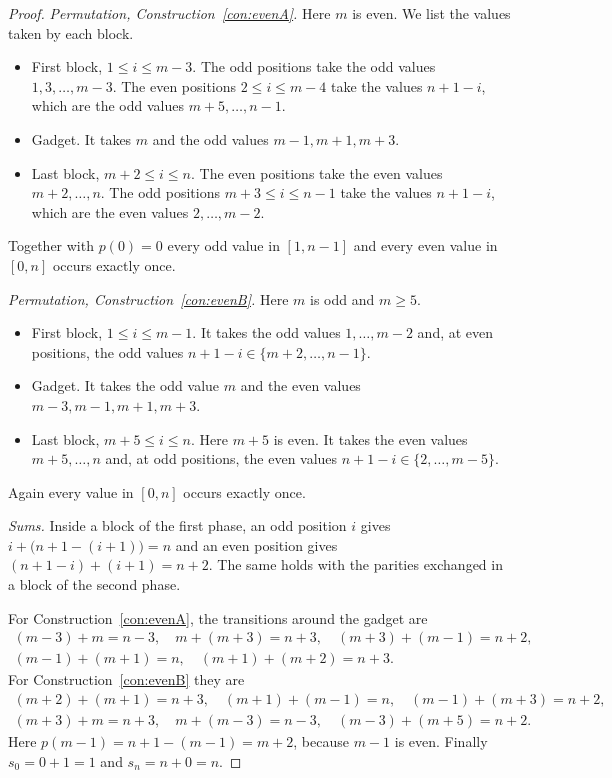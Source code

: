 \documentclass[11pt]{article}
\numberwithin{equation}{section}
\theoremstyle{definition}
\theoremstyle{remark}
\begin{document}
\begin{proof}
\emph{Permutation, Construction~\ref{con:evenA}.} Here $m$ is even. We list the values taken by each block.
\begin{itemize}
  \item First block, $1\le i\le m-3$. The odd positions take the odd values $1,3,\dots,m-3$. The even
  positions $2\le i\le m-4$ take the values $n+1-i$, which are the odd values $m+5,\dots,n-1$.
  \item Gadget. It takes $m$ and the odd values $m-1,m+1,m+3$.
  \item Last block, $m+2\le i\le n$. The even positions take the even values $m+2,\dots,n$. The odd
  positions $m+3\le i\le n-1$ take the values $n+1-i$, which are the even values $2,\dots,m-2$.
\end{itemize}
Together with $p(0)=0$ every odd value in $[1,n-1]$ and every even value in $[0,n]$ occurs exactly
once.

\emph{Permutation, Construction~\ref{con:evenB}.} Here $m$ is odd and $m\ge5$.
\begin{itemize}
  \item First block, $1\le i\le m-1$. It takes the odd values $1,\dots,m-2$ and, at even positions,
  the odd values $n+1-i\in\{m+2,\dots,n-1\}$.
  \item Gadget. It takes the odd value $m$ and the even values $m-3,m-1,m+1,m+3$.
  \item Last block, $m+5\le i\le n$. Here $m+5$ is even. It takes the even values $m+5,\dots,n$
  and, at odd positions, the even values $n+1-i\in\{2,\dots,m-5\}$.
\end{itemize}
Again every value in $[0,n]$ occurs exactly once.

\emph{Sums.} Inside a block of the first phase, an odd position $i$ gives
$i+\big(n+1-(i+1)\big)=n$ and an even position gives $(n+1-i)+(i+1)=n+2$. The same holds with the
parities exchanged in a block of the second phase.

For Construction~\ref{con:evenA}, the transitions around the gadget are
\[
\begin{gathered}(m-3)+m=n-3,\quad m+(m+3)=n+3,\quad (m+3)+(m-1)=n+2,\\ (m-1)+(m+1)=n,\quad (m+1)+(m+2)=n+3.\end{gathered}
\]
For Construction~\ref{con:evenB} they are
\[
\begin{gathered}
(m+2)+(m+1)=n+3,\quad (m+1)+(m-1)=n,\quad (m-1)+(m+3)=n+2,\\
(m+3)+m=n+3,\quad m+(m-3)=n-3,\quad (m-3)+(m+5)=n+2.
\end{gathered}
\]
Here $p(m-1)=n+1-(m-1)=m+2$, because $m-1$ is even. Finally $s_0=0+1=1$ and $s_n=n+0=n$.
\end{proof}
\end{document}
